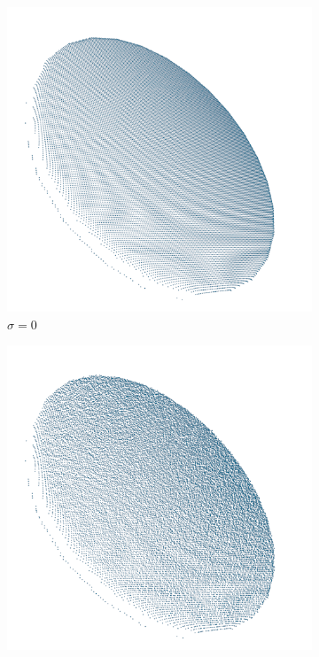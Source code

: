 \begin{figure}[!bh]
	\centering
	\hfill
	\begin{subfigure}{0.32\textwidth}
		\centering
		\includegraphics[width=\linewidth]{Figures/ObjRecog/stddev_0}
		\caption{$\sigma=0$}
		\label{subfig:objrecog:noise:0}
	\end{subfigure}
	\hfill
	\begin{subfigure}{0.32\textwidth}
		\centering
		\includegraphics[width=\linewidth]{Figures/ObjRecog/stddev_01}

\end{subfigure}
\end{figure}
